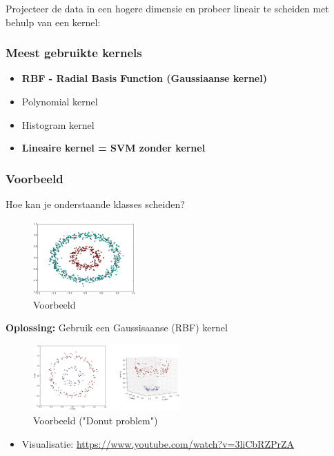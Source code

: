 \documentclass{article}
\begin{document}
Projecteer de data in een hogere dimensie en probeer lineair te scheiden met behulp van een kernel:

\subsubsection{Meest gebruikte kernels}

\begin{itemize}
    \item \textbf{RBF - Radial Basis Function (Gaussiaanse kernel)}
    \item Polynomial kernel
    \item Histogram kernel
    \item \textbf{Lineaire kernel = SVM zonder kernel}
\end{itemize}

\subsubsection{Voorbeeld}

Hoe kan je onderstaande klasses scheiden?

\begin{figure}[H]
    \centering
    \includegraphics[width=0.35\textwidth]{svm-kernels.png}
    \caption{Voorbeeld}
\end{figure}

\textbf{Oplossing:} Gebruik een Gaussisaanse (RBF) kernel

\begin{figure}[H]
    \centering
    \includegraphics[width=0.5\textwidth]{svm-kernels2.png}
    \caption{Voorbeeld ("Donut problem")}
\end{figure}

\begin{itemize}
    \item Visualisatie: \url{https://www.youtube.com/watch?v=3liCbRZPrZA}
\end{itemize}
\end{document}
